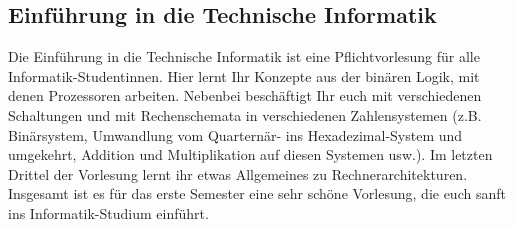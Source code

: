 \subsection{Einführung in die Technische Informatik}
\label{info2}
Die Einführung in die Technische Informatik ist eine Pflichtvorlesung für alle Informatik-Studentinnen. Hier lernt Ihr Konzepte aus der binären Logik, mit denen Prozessoren arbeiten. Nebenbei beschäftigt Ihr euch mit verschiedenen Schaltungen und mit Rechenschemata in verschiedenen Zahlensystemen (z.B. Binärsystem, Umwandlung vom Quarternär- ins Hexadezimal-System und umgekehrt, Addition und Multiplikation auf diesen Systemen usw.). Im letzten Drittel der Vorlesung lernt ihr etwas Allgemeines zu Rechnerarchitekturen. Insgesamt ist es für das erste Semester eine sehr schöne Vorlesung, die euch sanft ins Informatik-Studium einführt.
